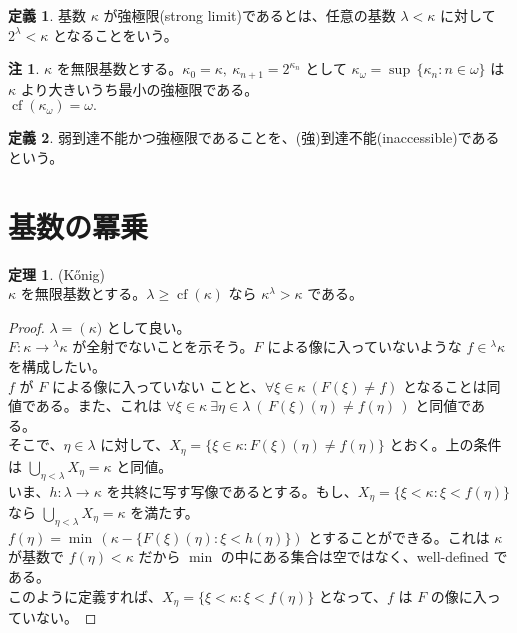 \documentclass{jsarticle}
\theoremstyle{definition}
\newtheorem*{definition*}{定義}
\newtheorem{theorem}{定理}[section]
\newtheorem{remark}{注}[section]
\begin{document}
    \begin{definition*}
        基数 $\kappa$ が強極限(strong limit)であるとは、任意の基数 $\lambda < \kappa$ に対して $2^\lambda < \kappa$ となることをいう。
    \end{definition*}
    \begin{remark}
        $\kappa$ を無限基数とする。$\kappa_0 = \kappa, \ \kappa_{n+1} = 2^{\kappa_{n}}$ として $\kappa_{\omega} = \sup \, \{\kappa_n : n \in \omega\}$ は $\kappa$ より大きいうち最小の強極限である。\\
        $\operatorname{cf}(\kappa_\omega) = \omega.$
    \end{remark}
    \begin{definition*}
        弱到達不能かつ強極限であることを、(強)到達不能(inaccessible)であるという。
    \end{definition*}
    
    \newpage
    \section{基数の冪乗}
    \begin{theorem} \label{Konigs_lemma} (Kőnig) \\
        $\kappa$ を無限基数とする。$\lambda \geq \operatorname{cf}(\kappa)$ なら $\kappa^\lambda > \kappa$ である。
    \end{theorem}
    \begin{proof}
        $\lambda = \operatorname(\kappa)$ として良い。\\
        $F : \kappa \rightarrow {^\lambda\kappa}$ が全射でないことを示そう。$F$ による像に入っていないような $f \in {^\lambda\kappa}$ を構成したい。\\
        $f$ が $F$ による像に入っていない ことと、$\forall \xi \in \kappa \ (F(\xi) \neq f)$ となることは同値である。また、これは $\forall \xi \in \kappa \ \exists \eta \in \lambda \ (\,F(\xi)(\eta) \neq f(\eta)\,)$ と同値である。\\
        そこで、$\eta \in \lambda$ に対して、$X_\eta = \{\xi \in \kappa : F(\xi)(\eta) \neq f(\eta)\}$ とおく。上の条件は $\bigcup_{\eta < \lambda} X_\eta = \kappa$ と同値。\\
        いま、$h : \lambda \rightarrow \kappa$ を共終に写す写像であるとする。もし、$X_\eta = \{\xi < \kappa : \xi < f(\eta)\}$ なら $\bigcup_{\eta < \lambda} X_\eta = \kappa$ を満たす。\\
        $f(\eta) = \min \, (\kappa - \{F(\xi)(\eta) : \xi < h(\eta)\})$ とすることができる。これは $\kappa$ が基数で $f(\eta) < \kappa$ だから $\min$ の中にある集合は空ではなく、well-defined である。\\
        このように定義すれば、$X_\eta = \{\xi < \kappa : \xi < f(\eta)\}$ となって、$f$ は $F$ の像に入っていない。
    \end{proof}
    
\end{document}
